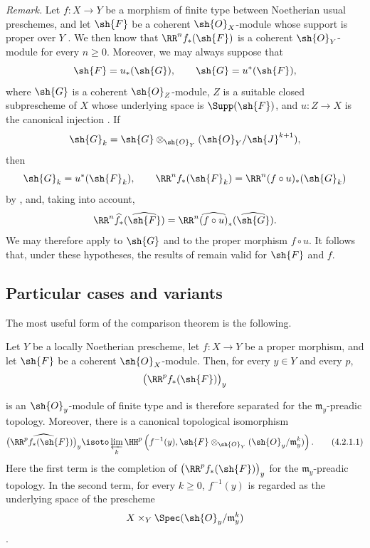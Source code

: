 \begin{env}[4.1.10]
\label{III.4.1.10}
\emph{Remark.}
Let $f:X\to Y$ be a morphism of finite type between Noetherian usual
preschemes, and let $\sh{F}$ be a coherent $\sh{O}_X$-module whose
support is proper over $Y$ .
We then know  that $\RR^n f_*(\sh{F})$ is a coherent
$\sh{O}_Y$-module for every $n\geq0$.
Moreover, we may always suppose that
\[
  \sh{F}=u_*(\sh{G}),
  \qquad
  \sh{G}=u^*(\sh{F}),
\]
where $\sh{G}$ is a coherent $\sh{O}_Z$-module, $Z$ is a suitable
closed subprescheme of $X$ whose underlying space is
$\Supp(\sh{F})$, and $u:Z\to X$ is the canonical injection
.
If
\[
  \sh{G}_k
  =
  \sh{G}\otimes_{\sh{O}_Y}
  (\sh{O}_Y/\sh{J}^{k+1}),
\]
then
\[
  \sh{G}_k=u^*(\sh{F}_k),
  \qquad
  \RR^n f_*(\sh{F}_k)
  =
  \RR^n(f\circ u)_*(\sh{G}_k)
\]
by , and, taking  into account,
\[
  \RR^n\widehat{f}_*(\widehat{\sh{F}})
  =
  \RR^n\widehat{(f\circ u)}_*(\widehat{\sh{G}}).
\]
We may therefore apply  to $\sh{G}$ and to the proper
morphism $f\circ u$.
It follows that, under these hypotheses, the results of
 remain valid for $\sh{F}$ and $f$.
\end{env}


\subsection{Particular cases and variants}
\label{subsection:III.4.2}

The most useful form of the comparison theorem  is
the following.

\begin{proposition}[4.2.1]
\label{III.4.2.1}
Let $Y$ be a locally Noetherian prescheme, let $f:X\to Y$ be a
proper morphism, and let $\sh{F}$ be a coherent $\sh{O}_X$-module.
Then, for every $y\in Y$ and every $p$,
\[
  \bigl(\RR^p f_*(\sh{F})\bigr)_y
\]


is an $\sh{O}_y$-module of finite type and is therefore separated
for the $\mathfrak{m}_y$-preadic topology.
Moreover, there is a canonical topological isomorphism
\[
  \widehat{\bigl(\RR^p f_*(\sh{F})\bigr)_y}
  \isoto
  \varprojlim_k
  \HH^p\left(
    f^{-1}(y),
    \sh{F}\otimes_{\sh{O}_Y}
    (\sh{O}_y/\mathfrak{m}_y^k)
  \right).
  \tag{4.2.1.1}
  \label{III.4.2.1.1}
\]
Here the first term is the completion of
$\bigl(\RR^p f_*(\sh{F})\bigr)_y$ for the
$\mathfrak{m}_y$-preadic topology.
In the second term, for every $k\geq0$, $f^{-1}(y)$ is regarded as
the underlying space of the prescheme
\[
  X\times_Y\Spec(\sh{O}_y/\mathfrak{m}_y^k)
\]
.
\end{proposition}

